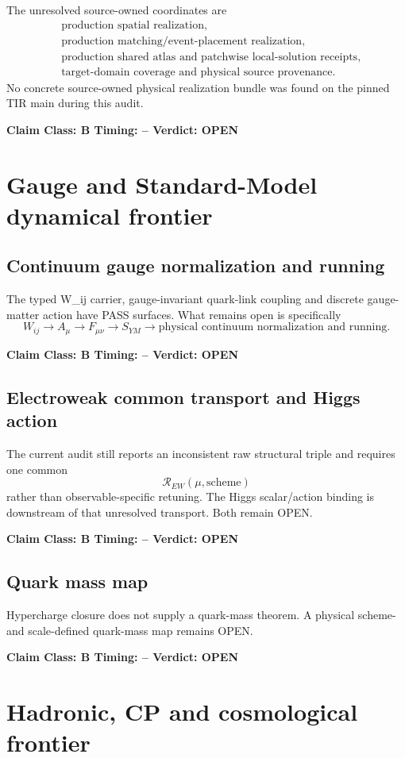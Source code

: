 \documentclass[11pt,a4paper,twoside]{book}
\def\({}%
\def\){}%
\theoremstyle{definition}
\newcommand{\vTwelveStatus}[3]{\par\noindent\textbf{Claim Class: #1 \quad Timing: #2 \quad Verdict: #3}\par}
\begin{document}
The unresolved source-owned coordinates are
\[
\boxed{
\begin{aligned}
&\text{production spatial realization},\\
&\text{production matching/event-placement realization},\\
&\text{production shared atlas and patchwise local-solution receipts},\\
&\text{target-domain coverage and physical source provenance}.
\end{aligned}}
\]
No concrete source-owned physical realization bundle was found on the pinned
TIR main during this audit.
\vTwelveStatus{B}{--}{OPEN}

\section{Gauge and Standard-Model dynamical frontier}

\subsection{Continuum gauge normalization and running}

The typed \(W_{ij}\) carrier, gauge-invariant quark-link coupling and discrete
gauge-matter action have PASS surfaces. What remains open is specifically
\[
\boxed{
W_{ij}\to A_\mu\to F_{\mu\nu}\to S_{YM}
\to\text{physical continuum normalization and running}.
}
\]
\vTwelveStatus{B}{--}{OPEN}

\subsection{Electroweak common transport and Higgs action}

The current audit still reports an inconsistent raw structural triple and
requires one common
\[
\boxed{\mathcal R_{EW}(\mu,\mathrm{scheme})}
\]
rather than observable-specific retuning. The Higgs scalar/action binding is
downstream of that unresolved transport. Both remain OPEN.
\vTwelveStatus{B}{--}{OPEN}

\subsection{Quark mass map}

Hypercharge closure does not supply a quark-mass theorem. A physical
scheme- and scale-defined quark-mass map remains OPEN.
\vTwelveStatus{B}{--}{OPEN}

\section{Hadronic, CP and cosmological frontier}
\end{document}
